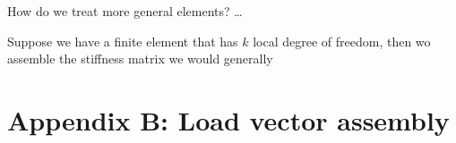 \documentclass[]{report}
\begin{document}
    How do we treat more general elements? \dots

    Suppose we have a finite element that has $k$ local degree of freedom, then wo assemble the stiffness matrix we would generally 

    \section*{Appendix B: Load vector assembly}



    


    
\end{document}
